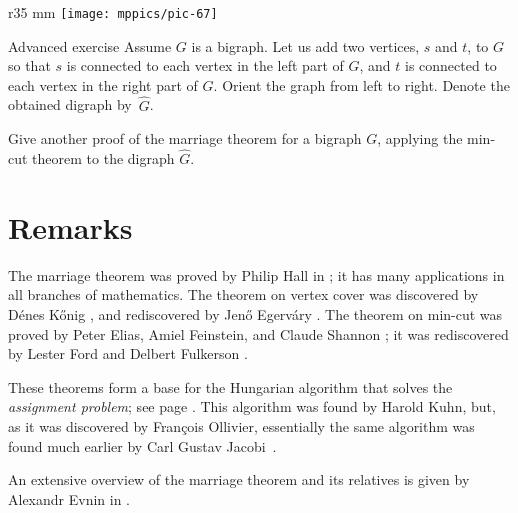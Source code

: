 {

\begin{wrapfigure}{r}{35 mm}
\vskip-0mm
\centering
\texttt{[image: mppics/pic-67]}
\end{wrapfigure}

\begin{thm}{Advanced exercise}\label{ex:min-cut-marriage}
Assume $G$ is a bigraph.
Let us add two vertices, $s$ and $t$, to $G$ so that $s$ is connected to each vertex in the left part of $G$, and $t$ is connected to each vertex in the right part of $G$.
Orient the graph from left to right.
Denote the obtained digraph by~$\hat G$.

Give another proof of the marriage theorem for a bigraph $G$, applying the min-cut theorem to the digraph $\hat G$. 
\end{thm}

}


\section{Remarks}

The marriage theorem was proved by Philip Hall in \cite{hall};
it has many applications in all branches of mathematics.
The theorem on vertex cover was discovered by D\'enes K\H{o}nig \cite{konig}, and rediscovered by Jen\H{o} Egerv\'ary \cite{egervary}.
The theorem on min-cut was proved by Peter Elias, Amiel Feinstein, and Claude Shannon \cite{elias-feinstein-shannon};
it was rediscovered by Lester Ford and Delbert Fulkerson \cite{ford-fulkerson}.

These theorems form a base for the Hungarian algorithm that solves the \emph{assignment problem}; see page \pageref{assignment problem}.
This algorithm was found by Harold Kuhn, but, as it was discovered by François Ollivier, essentially the same algorithm was found much earlier by Carl Gustav Jacobi~\cite{ollivier}.

An extensive overview of the marriage theorem and its relatives is given by Alexandr Evnin in \cite{evnin}.
